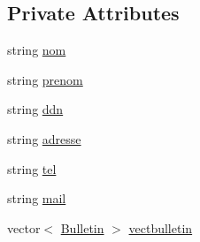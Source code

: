\subsection*{Private Attributes}
\begin{DoxyCompactItemize}
\item 
string \hyperlink{class_eleve_a912b79db853e8dd2e0fd5c9f0fae1986}{nom}
\item 
string \hyperlink{class_eleve_a751fd312c37f99b67b13dccf3e017f00}{prenom}
\item 
string \hyperlink{class_eleve_af66f74f6f47e1d9d548f4ea583181050}{ddn}
\item 
string \hyperlink{class_eleve_a397780b74849d969b9095457dba8e1c1}{adresse}
\item 
string \hyperlink{class_eleve_a4dbaefdec13d5feabd6c98eea3af84c1}{tel}
\item 
string \hyperlink{class_eleve_a55582aa568fa4bbbb3f7d151e49e4709}{mail}
\item 
vector$<$ \hyperlink{class_bulletin}{Bulletin} $>$ \hyperlink{class_eleve_ac5a4dd1b22caf00a6b055184b10b734d}{vectbulletin}
\end{DoxyCompactItemize}


